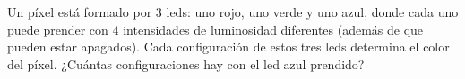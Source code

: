 Un píxel está formado por $3$ leds: uno rojo, uno verde y uno azul, donde cada uno puede prender con $4$ intensidades de luminosidad diferentes (además de que pueden estar apagados). Cada configuración de estos tres leds determina el color del píxel. ¿Cuántas configuraciones hay con el led azul prendido?